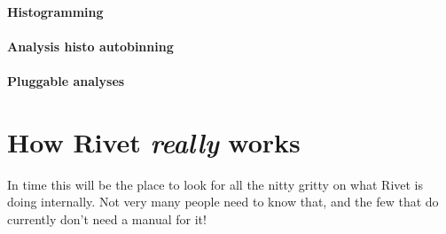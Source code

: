 \documentclass{JHEP3}
\begin{document}




\subsection{Histogramming}

\subsection{Analysis histo autobinning}
\subsection{Pluggable analyses}



\cleardoublepage
\part{How Rivet \emph{really} works}
\label{part:internals}

In time this will be the place to look for all the nitty gritty on what Rivet is
doing internally. Not very many people need to know that, and the few that do
currently don't need a manual for it!
\end{document}
